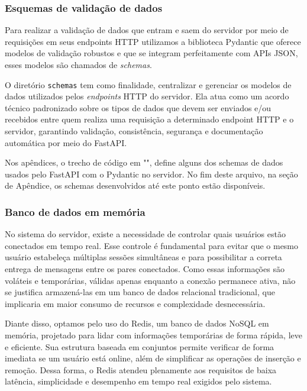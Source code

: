 \subsubsection{Esquemas de validação de dados}

Para realizar a validação de dados que entram e saem do servidor por
meio de requisições em seus endpoints \acs{HTTP} utilizamos a biblioteca
Pydantic que oferece modelos de validação robustos e que se integram
perfeitamente com \acsp{API} \acs{JSON}, esses modelos são chamados
de \textit{schemas}.

O diretório \texttt{schemas} tem como finalidade, centralizar e gerenciar
os modelos de dados utilizados pelos \textit{endpoints} \acs{HTTP} do servidor.
Ela atua como um acordo técnico padronizado sobre os tipos de dados
que devem ser enviados e/ou recebidos entre quem realiza uma requisição a
determinado endpoint \acs{HTTP} e o servidor, garantindo validação,
consistência, segurança e documentação automática por meio do FastAPI.

Nos apêndices, o trecho de código em
"", define alguns dos schemas de
dados usados
pelo FastAPI com o Pydantic no servidor. No fim deste arquivo, na
seção de Apêndice, os schemas desenvolvidos até este ponto estão disponíveis.

\subsubsection{Banco de dados em memória}

No sistema do servidor, existe a necessidade de controlar quais
usuários estão conectados em tempo real. Esse controle é fundamental
para evitar que o mesmo usuário estabeleça múltiplas sessões
simultâneas e para possibilitar a correta entrega de mensagens entre
os pares conectados. Como essas informações são voláteis e
temporárias, válidas apenas enquanto a conexão permanece ativa, não
se justifica armazená-las em um banco de dados relacional
tradicional, que implicaria em maior consumo de recursos e
complexidade desnecessária.

Diante disso, optamos pelo uso do Redis, um banco de dados NoSQL em
memória, projetado para lidar com informações temporárias de forma
rápida, leve e eficiente. Sua estrutura baseada em conjuntos permite
verificar de forma imediata se um usuário está online, além de
simplificar as operações de inserção e remoção. Dessa forma, o Redis
atendeu plenamente aos requisitos de baixa latência, simplicidade e
desempenho em tempo real exigidos pelo sistema.


